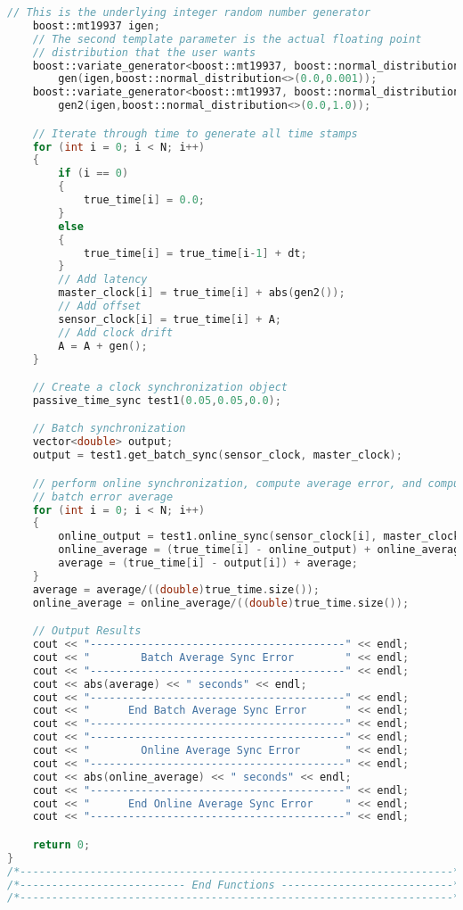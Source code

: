 \documentclass[11pt,a4paper]{article}
\begin{document}
\begin{lstlisting}[language=C++]
    // This is the underlying integer random number generator
    boost::mt19937 igen;
    // The second template parameter is the actual floating point
    // distribution that the user wants
    boost::variate_generator<boost::mt19937, boost::normal_distribution<> >
    	gen(igen,boost::normal_distribution<>(0.0,0.001));
    boost::variate_generator<boost::mt19937, boost::normal_distribution<> >
    	gen2(igen,boost::normal_distribution<>(0.0,1.0));

    // Iterate through time to generate all time stamps
    for (int i = 0; i < N; i++)
    {
        if (i == 0)
        {
            true_time[i] = 0.0;
        }
        else
        {
            true_time[i] = true_time[i-1] + dt;
        }
        // Add latency
        master_clock[i] = true_time[i] + abs(gen2());
        // Add offset
        sensor_clock[i] = true_time[i] + A; 
        // Add clock drift
        A = A + gen();
    }

    // Create a clock synchronization object
    passive_time_sync test1(0.05,0.05,0.0);

    // Batch synchronization
    vector<double> output;
    output = test1.get_batch_sync(sensor_clock, master_clock);

    // perform online synchronization, compute average error, and compute 
    // batch error average 
    for (int i = 0; i < N; i++)
    {
        online_output = test1.online_sync(sensor_clock[i], master_clock[i]);
        online_average = (true_time[i] - online_output) + online_average;
        average = (true_time[i] - output[i]) + average;
    }
    average = average/((double)true_time.size());
    online_average = online_average/((double)true_time.size());

    // Output Results
    cout << "----------------------------------------" << endl;
    cout << "        Batch Average Sync Error        " << endl;
    cout << "----------------------------------------" << endl;
    cout << abs(average) << " seconds" << endl;
    cout << "----------------------------------------" << endl;
    cout << "      End Batch Average Sync Error      " << endl;
    cout << "----------------------------------------" << endl;
    cout << "----------------------------------------" << endl;
    cout << "        Online Average Sync Error       " << endl;
    cout << "----------------------------------------" << endl;
    cout << abs(online_average) << " seconds" << endl;
    cout << "----------------------------------------" << endl;
    cout << "      End Online Average Sync Error     " << endl;
    cout << "----------------------------------------" << endl;

    return 0;
}
/*--------------------------------------------------------------------*/
/*-------------------------- End Functions ---------------------------*/
/*--------------------------------------------------------------------*/ 
\end{lstlisting}



\end{document}
